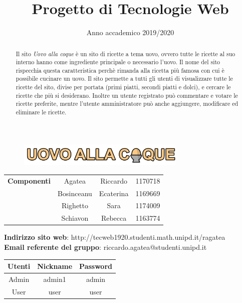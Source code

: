 
\title{Progetto di Tecnologie Web}
\author{}
\date{Anno accademico 2019/2020}


\maketitle
\begin{figure}[H]
	\centering
	\includegraphics[width=8cm]{img/logo.png}
\end{figure}
\begin{table}[H]
	\centering
	\begin{tabular}{c|c c c}
		\textbf{Componenti} & Agatea     & Riccardo  & 1170718 \\
		                    & Bosinceanu & Ecaterina & 1169669 \\
		                    & Righetto   & Sara      & 1174009 \\
		                    & Schiavon   & Rebecca   & 1163774 \\
	\end{tabular}
\end{table}

\begin{center}
	\textbf{Indirizzo sito web}: http://tecweb1920.studenti.math.unipd.it/ragatea\\
	\textbf{Email referente del gruppo}: riccardo.agatea@studenti.unipd.it
\end{center}

\begin{table}[H]
	\centering
	\begin{tabular}{c|c c}
		\textbf{Utenti} & \textbf{Nickname} & \textbf{Password} \\
		\hline
		Admin           & admin1 & admin             \\
		User            & user   & user              \\
	\end{tabular}
\end{table}
\newpage
{}
\tableofcontents
\newpage
{}
\renewcommand{\abstractname}{Abstract}
\begin{abstract}
	Il sito \emph{Uovo alla coque} è un sito di ricette a tema uovo, ovvero tutte le ricette al suo interno hanno come ingrediente principale o necessario l'uovo. Il nome del sito rispecchia questa caratteristica perchè rimanda alla ricetta più famosa con cui è possibile cucinare un uovo. \newline
	Il sito permette a tutti gli utenti di visualizzare tutte le ricette del sito, divise per portata (primi piatti, secondi piatti e dolci), e cercare le ricette che più si desiderano. Inoltre un utente registrato può commentare e votare le ricette preferite, mentre l'utente amministratore può anche aggiungere, modificare ed eliminare le ricette.
\end{abstract}
\newpage

\newpage

\newpage

\newpage

\newpage


